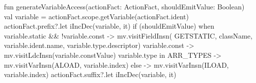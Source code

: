 \begin{KotlinCode}[float,numbers=none,caption=Implementation of the \texttt{generateVariableAccess} method of the \texttt{ActionFactGenerator}., label=lst:BtGenExprActionFactVarAccGen]
fun generateVariableAccess(actionFact: ActionFact, shouldEmitValue: Boolean) {
    val variable = actionFact.scope.getVariable(actionFact.ident)
    actionFact.prefix?.let {   iIncDec(variable, it)    }
    if (shouldEmitValue) {
        when {
            variable.static && !variable.const -> mv.visitFieldInsn(
                GETSTATIC, className, variable.ident.name, variable.type.descriptor)
            variable.const -> mv.visitLdcInsn(variable.constValue)
            variable.type in ARR_TYPES -> mv.visitVarInsn(ALOAD, variable.index)
            else -> mv.visitVarInsn(ILOAD, variable.index)
        }
    }
    actionFact.suffix?.let {   iIncDec(variable, it)    }
}
\end{KotlinCode}

